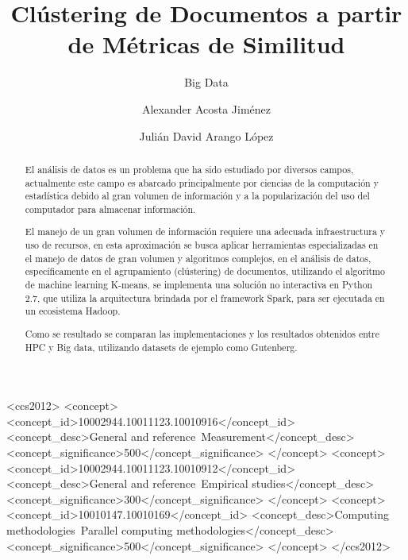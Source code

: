 \documentclass[sigconf]{acmart}
\begin{document}
\title{Clústering de Documentos a partir de Métricas de Similitud}
\subtitle{Big Data}

\author{Alexander Acosta Jiménez}

\author{Julián David Arango López}


\begin{abstract}
El análisis de datos es un problema que ha sido estudiado por diversos campos,
actualmente este campo es abarcado principalmente por ciencias de la computación
y estadística debido al gran volumen de información y a la popularización del
uso del computador para almacenar información.

El manejo de un gran volumen de información requiere una adecuada infraestructura
y uso de recursos, en esta aproximación se busca aplicar herramientas
especializadas en el manejo de datos de gran volumen y algoritmos complejos,
en el análisis de datos, específicamente en el agrupamiento (clústering)
de documentos, utilizando  el algoritmo de machine learning K-means,
se implementa una solución no interactiva en Python 2.7, que utiliza la
arquitectura brindada por el framework Spark, para ser ejecutada en un ecosistema
Hadoop.

Como se resultado se comparan las implementaciones y los resultados obtenidos
entre HPC y Big data, utilizando datasets de ejemplo como Gutenberg.
\end{abstract}

\begin{CCSXML}
<ccs2012>
<concept>
<concept_id>10002944.10011123.10010916</concept_id>
<concept_desc>General and reference~Measurement</concept_desc>
<concept_significance>500</concept_significance>
</concept>
<concept>
<concept_id>10002944.10011123.10010912</concept_id>
<concept_desc>General and reference~Empirical studies</concept_desc>
<concept_significance>300</concept_significance>
</concept>
<concept>
<concept_id>10010147.10010169</concept_id>
<concept_desc>Computing methodologies~Parallel computing methodologies</concept_desc>
<concept_significance>500</concept_significance>
</concept>
</ccs2012>
\end{CCSXML}


\maketitle


\end{document}
